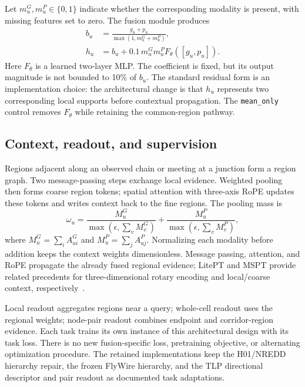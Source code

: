 Let $m^G_u,m^P_u\in\{0,1\}$ indicate whether the corresponding modality is present, with missing features set to zero. The fusion module produces
\begin{equation}
 \begin{aligned}
 b_u&=\frac{g_u+p_u}{\max(1,m^G_u+m^P_u)},\\
 h_u&=b_u+0.1\,m^G_um^P_u F_\theta([g_u,p_u]).
 \end{aligned}
 \label{eq:regional_fusion}
\end{equation}
Here $F_\theta$ is a learned two-layer MLP. The coefficient is fixed, but its output magnitude is not bounded to 10\% of $b_u$. The standard residual form is an implementation choice: the architectural change is that $h_u$ represents two corresponding local supports before contextual propagation. The \texttt{mean\_only} control removes $F_\theta$ while retaining the common-region pathway.

\subsection{Context, readout, and supervision}

Regions adjacent along an observed chain or meeting at a junction form a region graph. Two message-passing steps exchange local evidence. Weighted pooling then forms coarse region tokens; spatial attention with three-axis RoPE updates these tokens and writes context back to the fine regions. The pooling mass is
\begin{equation}
 \omega_u=\frac{M^G_u}{\max(\epsilon,\sum_v M^G_v)}
          +\frac{M^P_u}{\max(\epsilon,\sum_v M^P_v)},
 \label{eq:context_mass}
\end{equation}
where $M^G_u=\sum_i A^G_{ui}$ and $M^P_u=\sum_j A^P_{uj}$. Normalizing each modality before addition keeps the context weights dimensionless. Message passing, attention, and RoPE propagate the already fused regional evidence; LitePT and MSPT provide related precedents for three-dimensional rotary encoding and local/coarse context, respectively~\cite{litept2026,mspt2026}.

Local readout aggregates regions near a query; whole-cell readout uses the regional weights; node-pair readout combines endpoint and corridor-region evidence. Each task trains its own instance of this architectural design with its task loss. There is no new fusion-specific loss, pretraining objective, or alternating optimization procedure. The retained implementations keep the H01/NREDD hierarchy repair, the frozen FlyWire hierarchy, and the TLP directional descriptor and pair readout as documented task adaptations.

